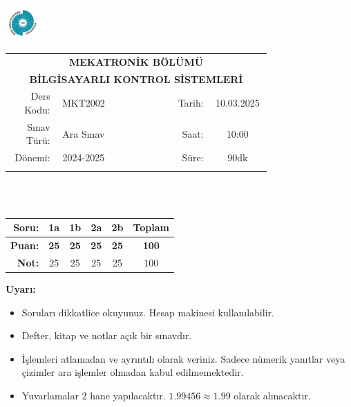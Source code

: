 \newcommand\UniversiteAdi{Niğde Ömer Halisdemir Üniversitesi}
\newcommand\BolumAdi{MEKATRONİK BÖLÜMÜ}
\newcommand\DersKodu{MKT2002}
\newcommand\DersAdi{BİLGİSAYARLI KONTROL SİSTEMLERİ}
\newcommand\SinavAdi{Ara Sınav}
\newcommand\SinavTarihi{10.03.2025}
\newcommand\SinavSaati{10:00}
\newcommand\SinavSuresi{90dk}

\pagestyle{fancy}
\fancyhf{} %
\noindent \includegraphics[width=0.1\textwidth]{logo}
\begin{tabular}{
    p{0.15\linewidth}
    p{0.15\linewidth}
    p{0.2\linewidth}
    p{0.1\linewidth}
    p{0.15\linewidth}}
    \multicolumn{5}{c}{\textbf{\BolumAdi}}\\
    \multicolumn{5}{c}{\textbf{\DersAdi}}\\\hline
    \multicolumn{1}{|r|}{Ders Kodu:}&
    \multicolumn{1}{|c|}{\DersKodu}&
    \multicolumn{1}{|c|}{}& 
    \multicolumn{1}{|r|}{Tarih:}&
    \multicolumn{1}{|c|}{\SinavTarihi} \\\hline
    \multicolumn{1}{|r|}{Sınav Türü:}&
    \multicolumn{1}{|c|}{\SinavAdi}&  
    \multicolumn{1}{|c|}{}&
    \multicolumn{1}{|r|}{Saat:}&
    \multicolumn{1}{|c|}{\SinavSaati}\\\hline
    \multicolumn{1}{|r|}{Dönemi:}&
    \multicolumn{1}{|c|}{2024-2025}&
    \multicolumn{1}{|c|}{}&
    \multicolumn{1}{|r|}{Süre:}&
    \multicolumn{1}{|c|}{\SinavSuresi} \\\hline
    &&&&\\
\end{tabular}\\\\
\noindent\begin{center}
\begin{tabular}{|r|c|c|c|c|c|}\hline
    \textbf{Soru:}&
    \textbf{1a}&
    \textbf{1b}&
    \textbf{2a}&
    \textbf{2b}&
    \textbf{Toplam}\\\hline
    \textbf{Puan:}&
    \textbf{25}&
    \textbf{25}&
    \textbf{25}&
    \textbf{25}&
    \textbf{100}\\\hline
    \textbf{Not:}&25&25&25&25&100\\\hline
\end{tabular}\end{center}
\noindent\textbf{Uyarı:}
\begin{itemize}\bfseries
    \item Soruları dikkatlice okuyunuz. Hesap makinesi kullanılabilir.
    \item Defter, kitap ve notlar açık bir sınavdır.
    \item İşlemleri atlamadan ve ayrıntılı olarak veriniz. Sadece nümerik yanıtlar veya çizimler ara işlemler olmadan kabul edilmemektedir.
    \item Yuvarlamalar 2 hane yapılacaktır. $\mathbf{1.99456\approx1.99}$ olarak alınacaktır.
\end{itemize}

